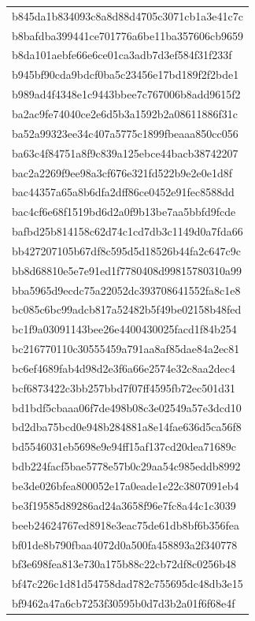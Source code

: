 \begin{tabular}{l}
b845da1b834093c8a8d88d4705c3071cb1a3e41c7c \\
b8bafdba399441ce701776a6be11ba357606cb9659 \\
b8da101aebfe66e6ce01ca3adb7d3ef584f31f233f \\
b945bf90cda9bdcf0ba5c23456e17bd189f2f2bde1 \\
b989ad4f4348e1c9443bbee7c767006b8add9615f2 \\
ba2ac9fe74040ce2e6d5b3a1592b2a08611886f31c \\
ba52a99323ee34c407a5775c1899fbeaaa850cc056 \\
ba63c4f84751a8f9c839a125ebce44bacb38742207 \\
bac2a2269f9ee98a3cf676e321fd522b9e2e0e1d8f \\
bac44357a65a8b6dfa2dff86ce0452e91fec8588dd \\
bac4cf6e68f1519bd6d2a0f9b13be7aa5bbfd9fcde \\
bafbd25b814158c62d74c1cd7db3c1149d0a7fda66 \\
bb427207105b67df8c595d5d18526b44fa2c647c9c \\
bb8d68810e5e7e91ed1f7780408d99815780310a99 \\
bba5965d9ecdc75a22052dc393708641552fa8c1e8 \\
bc085c6bc99adcb817a52482b5f49be02158b48fed \\
bc1f9a03091143bee26e4400430025facd1f84b254 \\
bc216770110c30555459a791aa8af85dae84a2ec81 \\
bc6ef4689fab4d98d2e3f6a66e2574e32c8aa2dec4 \\
bcf6873422c3bb257bbd7f07ff4595fb72ec501d31 \\
bd1bdf5cbaaa06f7de498b08c3e02549a57e3dcd10 \\
bd2dba75bcd0e948b284881a8e14fae636d5ca56f8 \\
bd5546031eb5698e9e94ff15af137cd20dea71689c \\
bdb224facf5bae5778e57b0c29aa54c985eddb8992 \\
be3de026bfea800052e17a0eade1e22c3807091eb4 \\
be3f19585d89286ad24a3658f96e7fc8a44c1c3039 \\
beeb24624767ed8918e3eac75de61db8bf6b356fea \\
bf01de8b790fbaa4072d0a500fa458893a2f340778 \\
bf3e698fea813e730a175b88c22cb72df8c0256b48 \\
bf47c226c1d81d54758dad782c755695dc48db3e15 \\
bf9462a47a6cb7253f30595b0d7d3b2a01f6f68e4f \\

\end{tabular}
